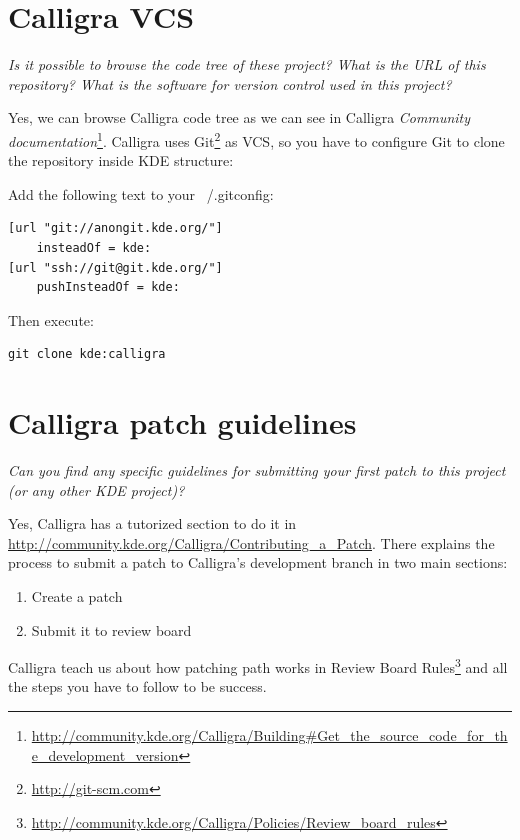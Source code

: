 \documentclass[11pt]{scrartcl}
\begin{document}
\section{Calligra VCS}
\label{sec:q-01}

\emph{Is it possible to browse the code tree of these project? What is the URL of this repository? What is the software for version control used in this project?}

\par Yes, we can browse Calligra code tree as we can see in Calligra \emph{Community documentation}\footnote{\url{http://community.kde.org/Calligra/Building\#Get_the_source_code_for_the_development_version}}. Calligra uses Git\footnote{\url{http://git-scm.com}} as VCS, so you have to configure Git to clone the repository inside KDE structure:

Add the following text to your ~/.gitconfig:
\begin{Verbatim}[frame=single]
[url "git://anongit.kde.org/"]
    insteadOf = kde:
[url "ssh://git@git.kde.org/"]
    pushInsteadOf = kde:
\end{Verbatim}

Then execute:
\begin{Verbatim}[frame=single]
 git clone kde:calligra
\end{Verbatim}

\section{Calligra patch guidelines}
\label{sec:q-02}

\emph{Can you find any specific guidelines for submitting your first patch to this project (or any other KDE project)?}

\par Yes, Calligra has a tutorized section to do it in \url{http://community.kde.org/Calligra/Contributing_a_Patch}.
There explains the process to submit a patch to Calligra's development branch in two main sections:

\begin{enumerate}
	\item Create a patch
	\item Submit it to review board
\end{enumerate}

\par Calligra teach us about how patching path works in Review Board Rules\footnote{\url{http://community.kde.org/Calligra/Policies/Review_board_rules}} and all the steps you have to follow to be success.
\end{document}
